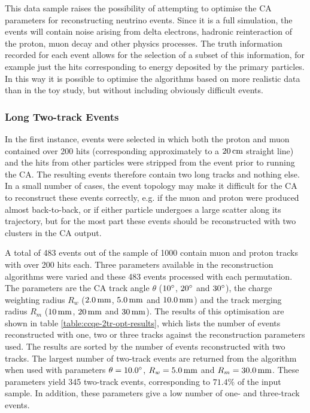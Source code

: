 This data sample raises the possibility of attempting to optimise the \ac{CA} parameters for reconstructing neutrino events. Since it is a full simulation, the events will contain noise arising from delta electrons, hadronic reinteraction of the proton, muon decay and other physics processes. The truth information recorded for each event allows for the selection of a subset of this information, for example just the hits corresponding to energy deposited by the primary particles. In this way it is possible to optimise the algorithms based on more realistic data than in the toy study, but without including obviously difficult events.

\subsubsection{Long Two-track Events}
In the first instance, events were selected in which both the proton and muon contained over 200 hits (corresponding approximately to a $20\,\mathrm{cm}$ straight line) and the hits from other particles were stripped from the event prior to running the \ac{CA}. The resulting events therefore contain two long tracks and nothing else. In a small number of cases, the event topology may make it difficult for the \ac{CA} to reconstruct these events correctly, e.g. if the muon and proton were produced almost back-to-back, or if either particle undergoes a large scatter along its trajectory, but for the most part these events should be reconstructed with two clusters in the \ac{CA} output.

A total of 483 events out of the sample of 1000 contain muon and proton tracks with over 200 hits each. Three parameters available in the reconstruction algorithms were varied and these 483 events processed with each permutation. The parameters are the \ac{CA} track angle $\theta$ ($10^\circ$, $20^\circ$ and $30^\circ$), the charge weighting radius $R_{w}$ ($2.0\,\mathrm{mm}$, $5.0\,\mathrm{mm}$ and $10.0\,\mathrm{mm}$) and the track merging radius $R_m$ ($10\,\mathrm{mm}$, $20\,\mathrm{mm}$ and $30\,\mathrm{mm}$). The results of this optimisation are shown in table \ref{table:ccqe-2tr-opt-results}, which lists the number of events reconstructed with one, two or three tracks against the reconstruction parameters used. The results are sorted by the number of events reconstructed with two tracks. The largest number of two-track events are returned from the algorithm when used with parameters $\theta=10.0^\circ$, $R_w=5.0\,\mathrm{mm}$ and $R_m=30.0\,\mathrm{mm}$. These parameters yield 345 two-track events, corresponding to $71.4\%$ of the input sample. In addition, these parameters give a low number of one- and three-track events.

